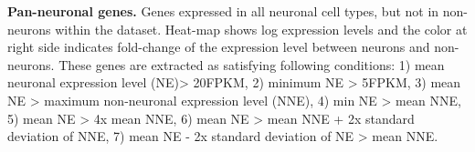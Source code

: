 \textbf{Pan-neuronal genes.} 
Genes expressed in all neuronal cell types, but not in non-neurons within the dataset. Heat-map shows log expression levels and the color at right side indicates fold-change of the expression level between neurons and non-neurons. These genes are extracted as satisfying following conditions: 1) mean neuronal expression level (NE)> 20FPKM, 2) minimum NE > 5FPKM, 3) mean NE > maximum non-neuronal expression level (NNE), 4) min NE > mean NNE, 5) mean NE > 4x mean NNE, 6) mean NE > mean NNE + 2x standard deviation of NNE, 7) mean NE - 2x standard deviation of NE > mean NNE. 



